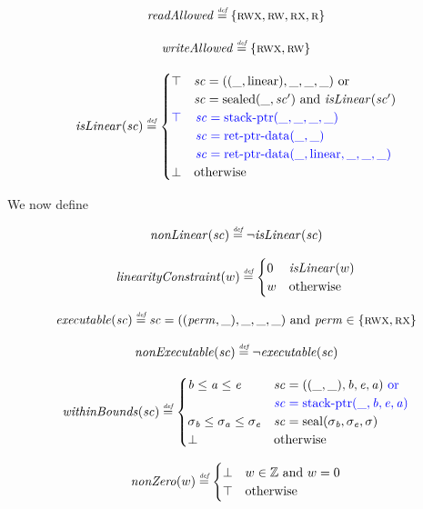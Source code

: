 \documentclass[a4paper]{article}
\begin{document}
\[
  \readAllowed{} \defeq \{ \rwx,\rw,\rx,\ro \}
\]

\[
  \writeAllowed{} \defeq \{ \rwx, \rw \}
\]

\[
  \isLinear{\cb} \defeq
  \begin{cases}
    \top & 
    \arraycolsep=0pt
    \begin{array}[t]{l}
      \cb = ((\_,\linear),\_,\_,\_) \tor\\
      \cb = \sealed{\_,\cb'} \tand \isLinear{\cb'} 
    \end{array}\\
    \src{\top} & 
    \sourcecolor\left.
    \arraycolsep=0pt
    \begin{array}[t]{l}
      \cb = \stkptr{\_,\_,\_,\_}\\
      \cb = \retptrd(\_,\_)\\
      \cb = \retptrd(\_,\linear,\_,\_,\_)
    \end{array}\right.\\
    \bot & \totherwise
  \end{cases}
\]

We now define 

\[
  \nonLinear{\cb} \defeq \neg \isLinear{\cb}
\]

\[
  \linCons{w} \defeq
  \begin{cases}
    0 & \isLinear{w} \\
    w & \totherwise
  \end{cases}
\]

\[
  \exec{\cb} \defeq 
      \cb = ((\perm, \_), \_, \_, \_) \tand \perm \in \{\rwx,\rx\} 
\]

\[
  \nonExec{\cb} \defeq \neg \exec{\cb}
\]

\[
  \withinBounds{\vsc} \defeq 
  \begin{cases}
    \baddr \leq \aaddr \leq \eaddr & 
    \arraycolsep=0pt
    \begin{array}[t]{l}
      \vsc = ((\_,\_),\baddr,\eaddr,\aaddr) \src{\tor}\\
      \src{\vsc = \stkptr{\_,\baddr,\eaddr,\aaddr}}
    \end{array}\\
    \sigma_\baddr \leq \sigma_\aaddr \leq \sigma_\eaddr & \vsc = \seal{\sigma_\baddr,\sigma_\eaddr,\sigma} \\
    \bot & \totherwise
  \end{cases}
\]

\[
  \nonZero{w} \defeq
  \begin{cases}
    \bot & w \in \ints \tand w = 0 \\
    \top & \totherwise
  \end{cases}
\]
\end{document}
